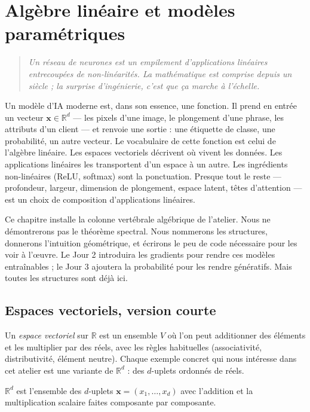\chapter{Algèbre linéaire et modèles paramétriques}
\label{ch:jour1}

\begin{quote}
\emph{\og Un réseau de neurones est un empilement d'applications linéaires entrecoupées de non-linéarités. La mathématique est comprise depuis un siècle ; la surprise d'ingénierie, c'est que ça marche à l'échelle. \fg}
\end{quote}

Un modèle d'IA moderne est, dans son essence, une fonction. Il prend en entrée un vecteur $\bm{x} \in \mathbb{R}^d$ --- les pixels d'une image, le plongement d'une phrase, les attributs d'un client --- et renvoie une sortie : une étiquette de classe, une probabilité, un autre vecteur. Le vocabulaire de cette fonction est celui de l'algèbre linéaire. Les espaces vectoriels décrivent où vivent les données. Les applications linéaires les transportent d'un espace à un autre. Les ingrédients non-linéaires (ReLU, softmax) sont la ponctuation. Presque tout le reste --- profondeur, largeur, dimension de plongement, espace latent, têtes d'attention --- est un choix de composition d'applications linéaires.

Ce chapitre installe la colonne vertébrale algébrique de l'atelier. Nous ne démontrerons pas le théorème spectral. Nous nommerons les structures, donnerons l'intuition géométrique, et écrirons le peu de code nécessaire pour les voir à l'œuvre. Le Jour 2 introduira les gradients pour rendre ces modèles entraînables ; le Jour 3 ajoutera la probabilité pour les rendre génératifs. Mais toutes les structures sont déjà ici.

\section{Espaces vectoriels, version courte}

Un \emph{espace vectoriel} sur $\mathbb{R}$ est un ensemble $V$ où l'on peut additionner des éléments et les multiplier par des réels, avec les règles habituelles (associativité, distributivité, élément neutre). Chaque exemple concret qui nous intéresse dans cet atelier est une variante de $\mathbb{R}^d$ : des $d$-uplets ordonnés de réels.

\begin{definition}
$\mathbb{R}^d$ est l'ensemble des $d$-uplets $\bm{x} = (x_1, \ldots, x_d)$ avec l'addition et la multiplication scalaire faites composante par composante.
\end{definition}

